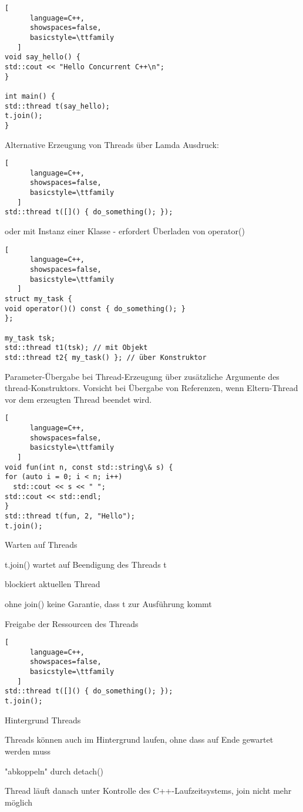 \documentclass[10pt]{article}
\begin{document}
\begin{itemize*}
\begin{lstlisting}[
      language=C++,
      showspaces=false,
      basicstyle=\ttfamily
   ]
void say_hello() {
std::cout << "Hello Concurrent C++\n";
}

int main() {
std::thread t(say_hello);
t.join();
}
\end{lstlisting}

Alternative Erzeugung von Threads über Lamda Ausdruck: 
\begin{lstlisting}[
      language=C++,
      showspaces=false,
      basicstyle=\ttfamily
   ]
std::thread t([]() { do_something(); });
\end{lstlisting}

oder mit Instanz einer Klasse - erfordert Überladen von operator()
\begin{lstlisting}[
      language=C++,
      showspaces=false,
      basicstyle=\ttfamily
   ]
struct my_task {
void operator()() const { do_something(); }
};

my_task tsk;
std::thread t1(tsk); // mit Objekt
std::thread t2{ my_task() }; // über Konstruktor
\end{lstlisting}


Parameter-Übergabe bei Thread-Erzeugung über zusätzliche Argumente des thread-Konstruktors. Vorsicht bei Übergabe von Referenzen, wenn
Eltern-Thread vor dem erzeugten Thread beendet wird.
\begin{lstlisting}[
      language=C++,
      showspaces=false,
      basicstyle=\ttfamily
   ]
void fun(int n, const std::string\& s) {
for (auto i = 0; i < n; i++)
  std::cout << s << " ";
std::cout << std::endl;
}
std::thread t(fun, 2, "Hello");
t.join();
\end{lstlisting}


Warten auf Threads
\begin{itemize*}
  \item t.join() wartet auf Beendigung des Threads t
  \item blockiert aktuellen Thread
  \item ohne join() keine Garantie, dass t zur Ausführung kommt
  \item Freigabe der Ressourcen des Threads
\end{itemize*}
\begin{lstlisting}[
      language=C++,
      showspaces=false,
      basicstyle=\ttfamily
   ]
std::thread t([]() { do_something(); });
t.join();
\end{lstlisting}


Hintergrund Threads
\begin{itemize*}
  \item Threads können auch im Hintergrund laufen, ohne dass auf Ende gewartet werden muss
  \item "abkoppeln" durch detach()
  \item Thread läuft danach unter Kontrolle des C++-Laufzeitsystems, join nicht mehr möglich
\end{itemize*}


\end{itemize*}
\end{document}
